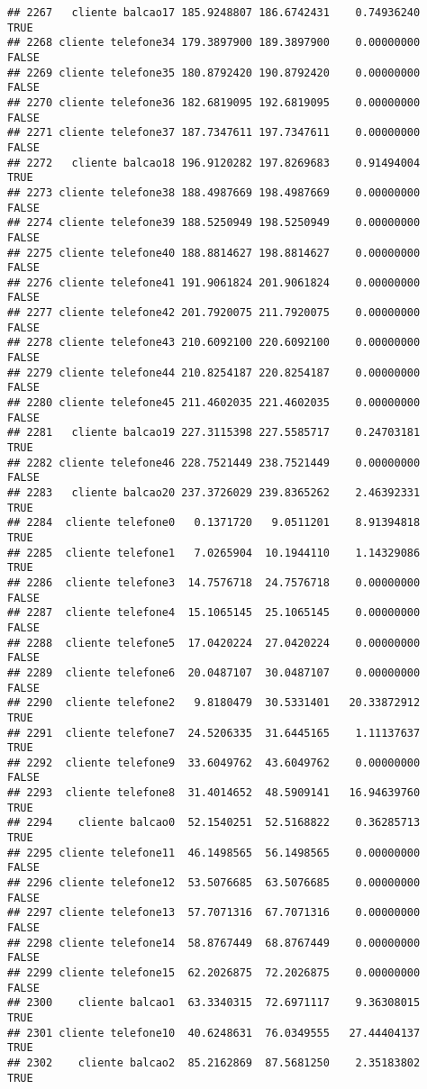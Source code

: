 \documentclass[
]{article}
\begin{document}
\begin{verbatim}
## 2267   cliente balcao17 185.9248807 186.6742431    0.74936240     TRUE
## 2268 cliente telefone34 179.3897900 189.3897900    0.00000000    FALSE
## 2269 cliente telefone35 180.8792420 190.8792420    0.00000000    FALSE
## 2270 cliente telefone36 182.6819095 192.6819095    0.00000000    FALSE
## 2271 cliente telefone37 187.7347611 197.7347611    0.00000000    FALSE
## 2272   cliente balcao18 196.9120282 197.8269683    0.91494004     TRUE
## 2273 cliente telefone38 188.4987669 198.4987669    0.00000000    FALSE
## 2274 cliente telefone39 188.5250949 198.5250949    0.00000000    FALSE
## 2275 cliente telefone40 188.8814627 198.8814627    0.00000000    FALSE
## 2276 cliente telefone41 191.9061824 201.9061824    0.00000000    FALSE
## 2277 cliente telefone42 201.7920075 211.7920075    0.00000000    FALSE
## 2278 cliente telefone43 210.6092100 220.6092100    0.00000000    FALSE
## 2279 cliente telefone44 210.8254187 220.8254187    0.00000000    FALSE
## 2280 cliente telefone45 211.4602035 221.4602035    0.00000000    FALSE
## 2281   cliente balcao19 227.3115398 227.5585717    0.24703181     TRUE
## 2282 cliente telefone46 228.7521449 238.7521449    0.00000000    FALSE
## 2283   cliente balcao20 237.3726029 239.8365262    2.46392331     TRUE
## 2284  cliente telefone0   0.1371720   9.0511201    8.91394818     TRUE
## 2285  cliente telefone1   7.0265904  10.1944110    1.14329086     TRUE
## 2286  cliente telefone3  14.7576718  24.7576718    0.00000000    FALSE
## 2287  cliente telefone4  15.1065145  25.1065145    0.00000000    FALSE
## 2288  cliente telefone5  17.0420224  27.0420224    0.00000000    FALSE
## 2289  cliente telefone6  20.0487107  30.0487107    0.00000000    FALSE
## 2290  cliente telefone2   9.8180479  30.5331401   20.33872912     TRUE
## 2291  cliente telefone7  24.5206335  31.6445165    1.11137637     TRUE
## 2292  cliente telefone9  33.6049762  43.6049762    0.00000000    FALSE
## 2293  cliente telefone8  31.4014652  48.5909141   16.94639760     TRUE
## 2294    cliente balcao0  52.1540251  52.5168822    0.36285713     TRUE
## 2295 cliente telefone11  46.1498565  56.1498565    0.00000000    FALSE
## 2296 cliente telefone12  53.5076685  63.5076685    0.00000000    FALSE
## 2297 cliente telefone13  57.7071316  67.7071316    0.00000000    FALSE
## 2298 cliente telefone14  58.8767449  68.8767449    0.00000000    FALSE
## 2299 cliente telefone15  62.2026875  72.2026875    0.00000000    FALSE
## 2300    cliente balcao1  63.3340315  72.6971117    9.36308015     TRUE
## 2301 cliente telefone10  40.6248631  76.0349555   27.44404137     TRUE
## 2302    cliente balcao2  85.2162869  87.5681250    2.35183802     TRUE

\end{verbatim}
\end{document}
